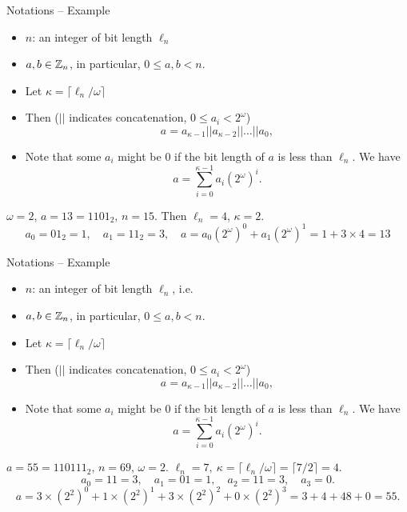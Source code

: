 \begin{frame}{Notations -- Example}
     \begin{itemize}
        \item $n$: an integer of bit length $\ell_n$ 
        \item $a, b\in{\mathbb Z}_n$, in particular, $0\leq a,b<n$.
       \item Let $\kappa=\lceil \ell_n/\omega\rceil$
      \item Then ($||$ indicates concatenation, $0\leq a_i< 2^{\omega}$)
\[
a=a_{\kappa-1}||a_{\kappa-2}||\dots||a_0,
\]
      \item Note that some $a_i$ might be $0$ if the bit length of $a$ is less than $\ell_n$. We have
\begin{equation*}
a=\sum_{i=0}^{\kappa-1}a_i(2^\omega)^i.
\end{equation*}
    \end{itemize}
\begin{example}
    $\omega=2$,  $a=13=1101_2$, $n=15$.
    Then $\ell_n=4$, $\kappa=2$.
    \[
    a_0=01_2=1,\quad a_1=11_2=3,\quad a=a_0(2^\omega)^0+a_1(2^{\omega})^1=1+3\times4=13
    \]
\end{example}
\end{frame}


\begin{frame}{Notations -- Example}
     \begin{itemize}
        \item $n$: an integer of bit length $\ell_n$, i.e. 
        \item $a, b\in{\mathbb Z}_n$, in particular, $0\leq a,b<n$.
       \item Let $\kappa=\lceil \ell_n/\omega\rceil$
      \item Then ($||$ indicates concatenation, $0\leq a_i< 2^{\omega}$)
\[
a=a_{\kappa-1}||a_{\kappa-2}||\dots||a_0,
\]
      \item Note that some $a_i$ might be $0$ if the bit length of $a$ is less than $\ell_n$. We have
\begin{equation*}
a=\sum_{i=0}^{\kappa-1}a_i(2^\omega)^i.
\end{equation*}
    \end{itemize}
\begin{example}
   $a=55=110111_2$, $n=69$, $\omega=2$.
$
  \ell_n=7,\ \kappa=\lceil \ell_n/\omega\rceil=\lceil7/2\rceil=4.
$
  \[
    a_0=11=3,\quad a_1=01=1,\quad a_2=11=3,\quad a_3=0.
    \]
    \[
    a=3\times(2^2)^0+1\times(2^2)^1+3\times(2^2)^2+0\times(2^2)^3=3+4+48+0=55.
    \]
\end{example}
\end{frame}


